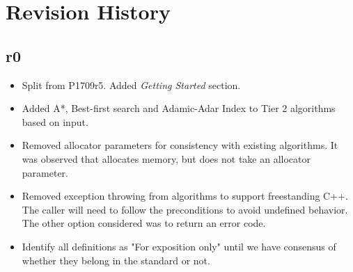 \section{Revision History}

\subsection*{\paperno r0}

\begin{itemize}
      \item Split from P1709r5. Added \textit{Getting Started} section.
      \item Added A*, Best-first search and Adamic-Adar Index to Tier 2 algorithms based on input.
      \item Removed allocator parameters for consistency with existing algorithms. It was observed that  
            allocates memory, but does not take an allocator parameter.
      \item Removed exception throwing from algorithms to support freestanding C++. The caller will need to
            follow the preconditions to avoid undefined behavior. The other option considered was to return
            an error code.
      \item Identify all  definitions as "For exposition only" until we have consensus of whether they 
            belong in the standard or not.
\end{itemize}

